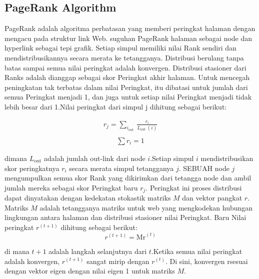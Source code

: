 \documentclass[conference]{IEEEtran}
\begin{document}
\subsection{PageRank Algorithm}
PageRank\cite{brin1998anatomy} adalah algoritma perbatasan yang memberi peringkat halaman
dengan mengacu pada struktur link Web. suguhan PageRank
halaman sebagai node dan hyperlink sebagai tepi grafik. Setiap simpul
memiliki nilai Rank sendiri dan mendistribusikannya secara merata ke tetangganya.
Distribusi berulang tanpa batas sampai semua nilai peringkat adalah
konvergen. Distribusi stasioner dari Ranks adalah
dianggap sebagai skor Peringkat akhir halaman. Untuk mencegah
peningkatan tak terbatas dalam nilai Peringkat, itu dibatasi untuk jumlah
dari semua Peringkat menjadi 1, dan juga untuk setiap nilai Peringkat menjadi tidak
lebih besar dari 1.Nilai peringkat dari simpul j dihitung sebagai
berikut:

\begin{equation}
    \begin{gathered}
    r_{j}=\sum_{i_{\text {out }}} \frac{r_{i}}{L_{\text {out }}(i)} \\
    \end{gathered}
    \end{equation}
    \begin{equation}
        \begin{gathered}
        \sum r_{i}=1
        \end{gathered}
        \end{equation}

dimana ${L_\text{out}}$ adalah jumlah out-link dari node $i$.Setiap simpul $i$ mendistribusikan skor peringkatnya $r_i$ secara merata simpul tetangganya $j$.
SEBUAH
node $j$ mengumpulkan semua skor Rank yang dikirimkan dari tetangga
node dan ambil jumlah mereka sebagai skor Peringkat baru $r_j$. Peringkat ini
proses distribusi dapat dinyatakan dengan kedekatan stokastik
matriks $M$ dan vektor pangkat $r$. Matriks $M$ adalah tetangganya
matriks untuk web yang mengkodekan hubungan lingkungan
antara halaman dan distribusi stasioner nilai Peringkat. Baru
Nilai peringkat $r^{(t+1)}$ dihitung sebagai berikut:
\begin{equation}
    r^{(t+1)}=\mathrm{Mr}^{(t)}
    \end{equation}

    di mana $t + 1$ adalah langkah selanjutnya dari $t$.Ketika semua nilai peringkat adalah
    konvergen, $r^{(t+1)}$ sangat mirip dengan $r^{(t)}$. Di sini, konvergen
    rsesuai dengan vektor eigen dengan nilai eigen 1 untuk matriks $M$.
\end{document}
